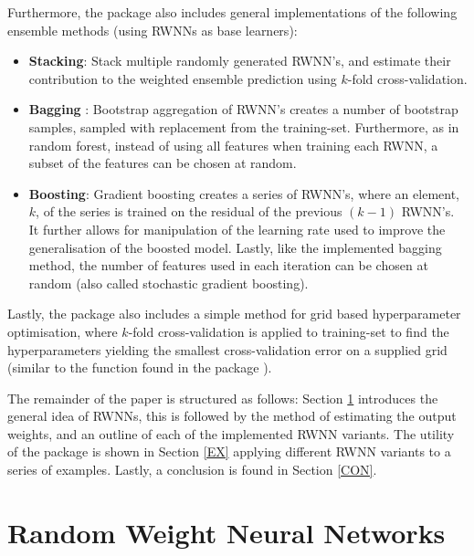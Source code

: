 \documentclass[
]{jss}
\providecommand{\tightlist}{%
  \setlength{\itemsep}{0pt}\setlength{\parskip}{0pt}}
\begin{document}
Furthermore, the  package also includes general
implementations of the following ensemble methods (using RWNNs as base
learners):

\begin{itemize}
\tightlist
\item
  \textbf{Stacking}: Stack multiple randomly generated RWNN's, and
  estimate their contribution to the weighted ensemble prediction using
  \(k\)-fold cross-validation.
\item
  \textbf{Bagging} \citep{Xin2021}: Bootstrap aggregation of RWNN's
  creates a number of bootstrap samples, sampled with replacement from
  the training-set. Furthermore, as in random forest, instead of using
  all features when training each RWNN, a subset of the features can be
  chosen at random.
\item
  \textbf{Boosting}: Gradient boosting creates a series of RWNN's, where
  an element, \(k\), of the series is trained on the residual of the
  previous \((k - 1)\) RWNN's. It further allows for manipulation of the
  learning rate used to improve the generalisation of the boosted model.
  Lastly, like the implemented bagging method, the number of features
  used in each iteration can be chosen at random (also called stochastic
  gradient boosting).
\end{itemize}

Lastly, the  package also includes a simple method for grid
based hyperparameter optimisation, where \(k\)-fold cross-validation is
applied to training-set to find the hyperparameters yielding the
smallest cross-validation error on a supplied grid (similar to the
 function found in the package ).

The remainder of the paper is structured as follows: Section \ref{RWNN}
introduces the general idea of RWNNs, this is followed by the method of
estimating the output weights, and an outline of each of the implemented
RWNN variants. The utility of the  package is shown in Section
\ref{EX} applying different RWNN variants to a series of examples.
Lastly, a conclusion is found in Section \ref{CON}.

\hypertarget{RWNN}{%
\section{Random Weight Neural Networks}\label{RWNN}}
\end{document}
